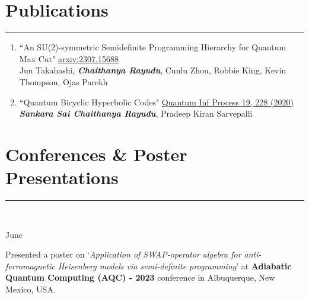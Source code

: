 \documentclass[10pt]{article}
\newcommand\vtick{\textquotesingle}
\begin{document}
\section*{\color{black} Publications}
\noindent\textcolor{black}{\rule{\textwidth}{1.5pt}} 
\begin{enumerate}[leftmargin=*]
    \item ``An SU(2)-symmetric Semidefinite Programming Hierarchy for Quantum Max Cut" \href{https://arxiv.org/abs/2307.15688}{arxiv:2307.15688}\\
    Jun Takahashi, {\it \bf Chaithanya Rayudu}, Cunlu Zhou, Robbie King, Kevin Thompson, Ojas Parekh 
    \item ``Quantum Bicyclic Hyperbolic Codes" \href{https://doi.org/10.1007/s11128-020-02727-0}{Quantum Inf Process 19, 228 (2020)}\\
    {\it \bf Sankara Sai Chaithanya Rayudu}, Pradeep Kiran Sarvepalli
\end{enumerate}


\vspace{0.3cm}
\section*{\color{black} Conferences \& Poster Presentations}
\noindent\textcolor{black}{\rule{\textwidth}{1.5pt}} \vspace{-0.2cm}\\
\begin{minipage}[t]{.2\textwidth}
June\vtick23
\end{minipage}
\begin{minipage}[t]{0.8\textwidth}
Presented a poster on `{\it Application of SWAP-operator algebra for anti-ferromagnetic Heisenberg models via semi-definite programming}' at {\bf Adiabatic Quantum Computing (AQC) - 2023} conference in Albuquerque, New Mexico, USA.
\end{minipage}\\
\end{document}
